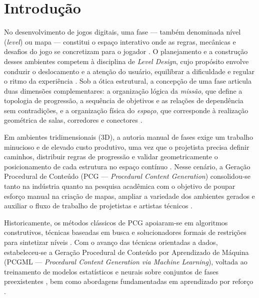\section{Introdução}
\label{sec:introducao}

No desenvolvimento de jogos digitais, uma fase --- também denominada nível (\textit{level}) ou mapa --- constitui o espaço interativo onde as regras, mecânicas e desafios do jogo se concretizam para o jogador \cite{tanagra, pcgbook}. O planejamento e a construção desses ambientes competem à disciplina de \textit{Level Design}, cujo propósito envolve conduzir o deslocamento e a atenção do usuário, equilibrar a dificuldade e regular o ritmo da experiência \cite{dormans2010, totten2014architectural}. Sob a ótica estrutural, a concepção de uma fase articula duas dimensões complementares: a organização lógica da \textit{missão}, que define a topologia de progressão, a sequência de objetivos e as relações de dependência sem contradições, e a organização física do \textit{espaço}, que corresponde à realização geométrica de salas, corredores e conectores \cite{dormans2010, linden2013designing, linden2014dungeons}.

Em ambientes tridimensionais (3D), a autoria manual de fases exige um trabalho minucioso e de elevado custo produtivo, uma vez que o projetista precisa definir caminhos, distribuir regras de progressão e validar geometricamente o posicionamento de cada estrutura no espaço contínuo \cite{linden2014dungeons, xu2025constraint}. Nesse cenário, a Geração Procedural de Conteúdo (PCG --- \textit{Procedural Content Generation}) consolidou-se tanto na indústria quanto na pesquisa acadêmica com o objetivo de poupar esforço manual na criação de mapas, ampliar a variedade dos ambientes gerados e auxiliar o fluxo de trabalho de projetistas e artistas técnicos \cite{pcgbook, summerville2018procedural, maleki2024procedural}.

Historicamente, os métodos clássicos de PCG apoiaram-se em algoritmos construtivos, técnicas baseadas em busca e solucionadores formais de restrições para sintetizar níveis \cite{togelius2011search, shaker2016constructive, smith2011answer, karth2017wavefunctioncollapse}. Com o avanço das técnicas orientadas a dados, estabeleceu-se a Geração Procedural de Conteúdo por Aprendizado de Máquina (PCGML --- \textit{Procedural Content Generation via Machine Learning}), voltada ao treinamento de modelos estatísticos e neurais sobre conjuntos de fases preexistentes \cite{summerville2018procedural}, bem como abordagens fundamentadas em aprendizado por reforço \cite{khalifa2020pcgrl}.

